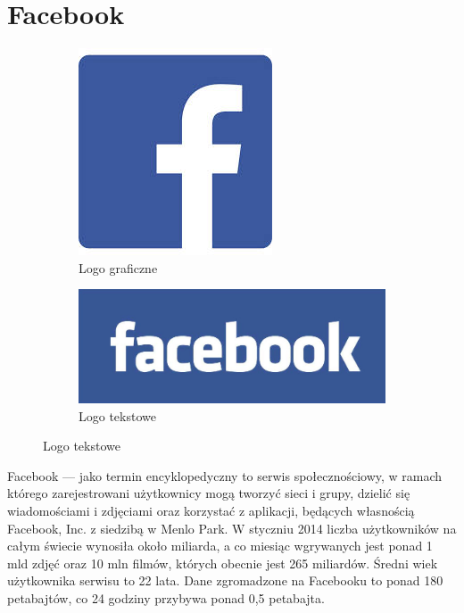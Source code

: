 \section{Facebook}
\label{sec:facebook}


\begin{figure}[!h]
\centering
\begin{subfigure}{.5\textwidth}
  \centering
  \includegraphics[width=.4\linewidth]{images/lukasz/pobrane.jpg}
  \caption{Logo graficzne}
  \label{fig:sub1}
\end{subfigure}%
\begin{subfigure}{.5\textwidth}
  \centering
  \includegraphics[width=.4\linewidth]{images/lukasz/facebook-logo.jpg}
  \caption{Logo tekstowe}
  \label{fig:sub2}
\end{subfigure}
\label{fig:logo-facebook}
\end{figure}


Facebook --- jako termin encyklopedyczny to serwis społecznościowy, w ramach którego zarejestrowani użytkownicy mogą tworzyć sieci i grupy, dzielić się wiadomościami i zdjęciami oraz korzystać z aplikacji, będących własnością Facebook, Inc. z siedzibą w Menlo Park. W styczniu 2014 liczba użytkowników na całym świecie wynosiła około miliarda, a co miesiąc wgrywanych jest ponad 1 mld zdjęć oraz 10 mln filmów, których obecnie jest 265 miliardów. Średni wiek użytkownika serwisu to 22 lata. Dane zgromadzone na Facebooku to ponad 180 petabajtów, co 24 godziny przybywa ponad 0,5 petabajta.


